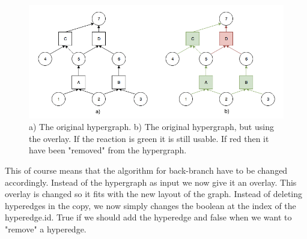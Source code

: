 \documentclass[a4paper,10pt,titlepage]{paper}
\begin{document}
\begin{figure}[H]
\centering
\includegraphics[scale=0.5]{Billeder/OverlayIllustration}
\caption{a) The original hypergraph. b) The original hypergraph, but using the overlay. If the reaction is green it is still usable. If red then it have been "removed" from the hypergraph.}
\end{figure}

This of course means that the algorithm for back-branch have to be changed accordingly. Instead of the hypergraph as input we now give it an overlay. This overlay is changed so it fits with the new layout of the graph. Instead of deleting hyperedges in the copy, we now simply changes the boolean at the index of the hyperedge.id. True if we should add the hyperedge and false when we want to "remove" a hyperedge.
\end{document}

